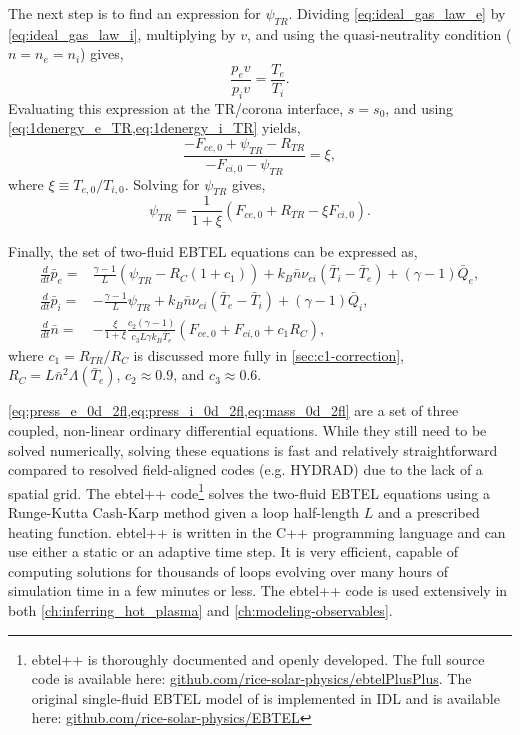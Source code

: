The next step is to find an expression for $\psi_{TR}$. Dividing \autoref{eq:ideal_gas_law_e} by \autoref{eq:ideal_gas_law_i}, multiplying by $v$, and using the quasi-neutrality condition ($n=n_e=n_i$) gives,
\begin{equation}
    \frac{p_ev}{p_iv} = \frac{T_e}{T_i}.
\end{equation}
Evaluating this expression at the TR/corona interface, $s=s_0$, and using \cref{eq:1denergy_e_TR,eq:1denergy_i_TR} yields,
\begin{equation}
    \frac{- F_{ce,0} + \psi_{TR} - R_{TR}}{- F_{ci,0} - \psi_{TR}} = \xi,
\end{equation}
where $\xi\equiv T_{e,0}/T_{i,0}$. Solving for $\psi_{TR}$ gives,
\begin{equation}\label{eq:psi_TR}
    \psi_{TR} = \frac{1}{1+\xi}(F_{ce,0} + R_{TR} - \xi F_{ci,0}).
\end{equation}

Finally, the set of two-fluid EBTEL equations can be expressed as,
\begin{align}
    \frac{d}{dt}\bar{p}_e =& \frac{\gamma - 1}{L}(\psi_{TR} - R_C(1 + c_1)) + k_B\bar{n}\nu_{ei}(\bar{T}_i - \bar{T}_e) + (\gamma - 1)\bar{Q}_e,\label{eq:press_e_0d_2fl} \\
    \frac{d}{dt}\bar{p}_i =& -\frac{\gamma - 1}{L}\psi_{TR} + k_B\bar{n}\nu_{ei}(\bar{T}_e - \bar{T}_i) + (\gamma - 1)\bar{Q}_i,\label{eq:press_i_0d_2fl} \\
    \frac{d}{dt}\bar{n} =& -\frac{\xi}{1+\xi}\frac{c_2(\gamma - 1)}{c_3L\gamma k_B\bar{T}_e}(F_{ce,0} + F_{ci,0} + c_1R_C),\label{eq:mass_0d_2fl}
\end{align}
where $c_1=R_{TR}/R_C$ is discussed more fully in \autoref{sec:c1-correction}, $R_C=L\bar{n}^2\Lambda(\bar{T}_e)$, $c_2\approx0.9$, and $c_3\approx0.6$.

\cref{eq:press_e_0d_2fl,eq:press_i_0d_2fl,eq:mass_0d_2fl} are a set of three coupled, non-linear ordinary differential equations. While they still need to be solved numerically, solving these equations is fast and relatively straightforward compared to resolved field-aligned codes (e.g. HYDRAD) due to the lack of a spatial grid. The ebtel++ code\footnote{ebtel++ is thoroughly documented and openly developed. The full source code is available here: \href{https://github.com/rice-solar-physics/ebtelPlusPlus}{github.com/rice-solar-physics/ebtelPlusPlus}. The original single-fluid EBTEL model of \citet{klimchuk_highly_2008,cargill_enthalpy-based_2012} is implemented in IDL and is available here: \href{https://github.com/rice-solar-physics/EBTEL}{github.com/rice-solar-physics/EBTEL}} solves the two-fluid EBTEL equations using a Runge-Kutta Cash-Karp method \citep[Section 16.2]{press_numerical_1992} given a loop half-length $L$ and a prescribed heating function. ebtel++ is written in the C++ programming language and can use either a static or an adaptive time step. It is very efficient, capable of computing solutions for thousands of loops evolving over many hours of simulation time in a few minutes or less. The ebtel++ code is used extensively in both \autoref{ch:inferring_hot_plasma} and \autoref{ch:modeling-observables}.

